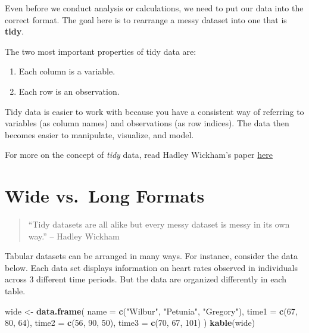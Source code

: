 \documentclass[]{book}
\newenvironment{Shaded}{\begin{snugshade}}{\end{snugshade}}
\newcommand{\DataTypeTok}[1]{\textcolor[rgb]{0.13,0.29,0.53}{#1}}
\newcommand{\DecValTok}[1]{\textcolor[rgb]{0.00,0.00,0.81}{#1}}
\newcommand{\KeywordTok}[1]{\textcolor[rgb]{0.13,0.29,0.53}{\textbf{#1}}}
\newcommand{\NormalTok}[1]{#1}
\newcommand{\StringTok}[1]{\textcolor[rgb]{0.31,0.60,0.02}{#1}}
\providecommand{\tightlist}{%
  \setlength{\itemsep}{0pt}\setlength{\parskip}{0pt}}
\begin{document}
Even before we conduct analysis or calculations, we need to put our data into the correct format. The goal here is to rearrange a messy dataset into one that is \textbf{tidy}.

The two most important properties of tidy data are:

\begin{enumerate}
\def\labelenumi{\arabic{enumi})}
\tightlist
\item
  Each column is a variable.
\item
  Each row is an observation.
\end{enumerate}

Tidy data is easier to work with because you have a consistent way of referring to variables (as column names) and observations (as row indices). The data then becomes easier to manipulate, visualize, and model.

For more on the concept of \emph{tidy} data, read Hadley Wickham's paper \href{http://vita.had.co.nz/papers/tidy-data.html}{here}

\hypertarget{wide-vs.long-formats}{%
\section{Wide vs.~Long Formats}\label{wide-vs.long-formats}}

\begin{quote}
``Tidy datasets are all alike but every messy dataset is messy in its own way.'' -- Hadley Wickham
\end{quote}

Tabular datasets can be arranged in many ways. For instance, consider the data below. Each data set displays information on heart rates observed in individuals across 3 different time periods. But the data are organized differently in each table.

\begin{Shaded}
\begin{Highlighting}[]
\NormalTok{wide <-}\StringTok{ }\KeywordTok{data.frame}\NormalTok{(}
  \DataTypeTok{name =} \KeywordTok{c}\NormalTok{(}\StringTok{"Wilbur"}\NormalTok{, }\StringTok{"Petunia"}\NormalTok{, }\StringTok{"Gregory"}\NormalTok{),}
  \DataTypeTok{time1 =} \KeywordTok{c}\NormalTok{(}\DecValTok{67}\NormalTok{, }\DecValTok{80}\NormalTok{, }\DecValTok{64}\NormalTok{),}
  \DataTypeTok{time2 =} \KeywordTok{c}\NormalTok{(}\DecValTok{56}\NormalTok{, }\DecValTok{90}\NormalTok{, }\DecValTok{50}\NormalTok{),}
  \DataTypeTok{time3 =} \KeywordTok{c}\NormalTok{(}\DecValTok{70}\NormalTok{, }\DecValTok{67}\NormalTok{, }\DecValTok{101}\NormalTok{)}
\NormalTok{)}
\KeywordTok{kable}\NormalTok{(wide)}
\end{Highlighting}
\end{Shaded}
\end{document}
